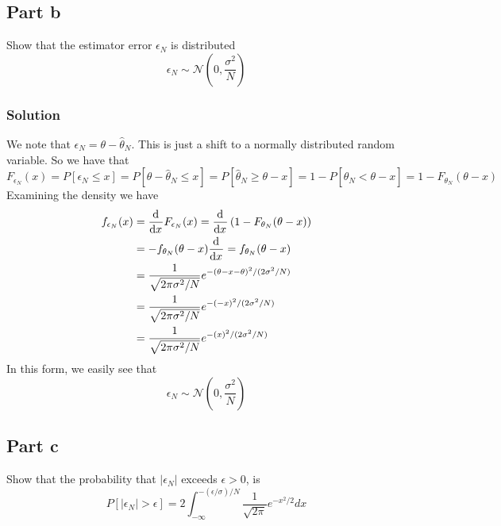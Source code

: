 \documentclass[a4paper]{article}
\begin{document}
\subsection*{Part b}%
Show that the estimator error $\epsilon_N$ is distributed 
\[
  \epsilon_N \sim \mathcal{N} \left( 0, \frac{\sigma^2}{N} \right)
\]

\subsubsection*{Solution}%
We note that $\epsilon_N = \theta - \hat{\theta}_N$. This is just a shift to a normally distributed random variable. So we have that 
\[
F_{\epsilon_N}(x) = P[\epsilon_N \leq x] = P[\theta - \hat{\theta}_N \leq x] = P[\hat{\theta}_N \geq \theta - x] = 1 - P[\hat{\theta}_N < \theta - x] = 1 - F_{\theta_N}(\theta - x)
\]
Examining the density we have
\[
  \begin{aligned}
    f_{\epsilon_N}(x) &= \dv[]{}{x} F_{\epsilon_N}(x) = \dv[]{}{x} \left(1 - F_{\theta_N}(\theta - x) \right) \\
                      &= - f_{\theta_N}(\theta - x) \dv[]{}{x} (-x) = f_{\theta_N}(\theta - x) \\
                      &= \frac{1}{\sqrt{2 \pi \sigma^2/N}} e^{-(\theta - x - \theta)^2/(2 \sigma^2/N)} \\
                      &= \frac{1}{\sqrt{2 \pi \sigma^2/N}} e^{-(- x)^2/(2 \sigma^2/N)} \\
                      &= \frac{1}{\sqrt{2 \pi \sigma^2/N}} e^{-(x)^2/(2 \sigma^2/N)} \\
  \end{aligned}
\]
In this form, we easily see that 
\[
  \epsilon_N \sim \mathcal{N}\left( 0, \frac{\sigma^2}{N} \right)
\]
\subsection*{Part c}%
Show that the probability that $|\epsilon_N|$ exceeds $\epsilon > 0$, is 
\[
  P[ |\epsilon_N| > \epsilon] = 2 \int_{-\infty}^{-(\epsilon/\sigma)/N} \frac{1}{\sqrt{2\pi}} e^{-x^2/2} dx
\]
\end{document}
